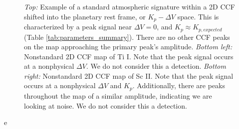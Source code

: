 \documentclass[twocolumn]{aastex631}
\begin{document}
            \begin{figure}
                    \centering
                    \caption{\textit{Top:} Example of a standard atmospheric signature within a 2D CCF shifted into the planetary rest frame, or $K_p-\Delta V$ space. This is characterized by a peak signal near $\Delta V = 0$, and $K_p \approx K_{p, expected}$ (Table \ref{tab:parameters_summary}). There are no other CCF peaks on the map approaching the primary peak's amplitude. \textit{Bottom left:} Nonstandard 2D CCF map of Ti I. Note that the peak signal occurs at a nonphysical $\Delta V$. We do not consider this a detection. \textit{Bottom right:} Nonstandard 2D CCF map of Sc II. Note that the peak signal occurs at a nonphysical $\Delta V$ and $K_p$. Additionally, there are peaks throughout the map of a similar amplitude, indicating we are looking at noise. We do not consider this a detection.}
                    \label{fig:standard-shape}
                \end{figure}    
                e
\end{document}

